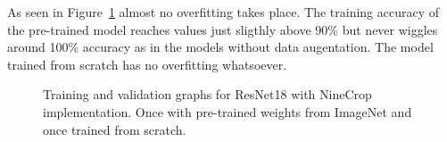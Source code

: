 \begin{table}[!h] \centering
{}
\caption{Resnet18 NineCrop implementation with and without pre-training. FINAL (regular) means ResNet18 with the resizing of the image instead of cropping and averaging.}
\label{tbl:resnet18-randomnine}
\end{table}

As seen in Figure~\ref{fig:resnet18-ninecrop-graph} almost no overfitting takes place. The  training accuracy of the pre-trained model reaches values just sligthly above  90\%  but never wiggles around 100\% accuracy as in the models without data augentation. The model trained from scratch has no overfitting whatsoever.

\begin{figure}[!h]
\centering
\caption{Training and validation graphs for ResNet18 with NineCrop implementation. Once with pre-trained weights from ImageNet and once trained from scratch.}
\label{fig:resnet18-ninecrop-graph}
\end{figure}

